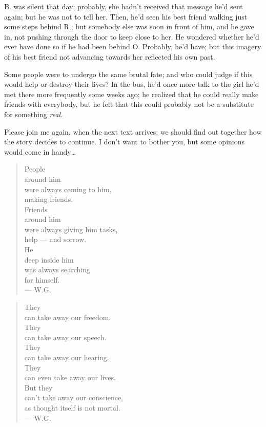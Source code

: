B. was silent that day; probably, she hadn't received that message he'd sent again; but he was not to tell her. Then, he'd seen his best friend walking just some steps behind R.; but somebody else was soon in front of him, and he gave in, not pushing through the door to keep close to her. He wondered whether he'd ever have done so if he had been behind O. Probably, he'd have; but this imagery of his best friend not advancing towards her reflected his own past.

Some people were to undergo the same brutal fate; and who could judge if this would help or destroy their lives?
In the bus, he'd once more talk to the girl he'd met there more frequently some weeks ago; he realized that he could really make friends with everybody, but he felt that this could probably not be a substitute for something \emph{real}.

Please join me again, when the next text arrives; we should find out together how the story decides to continue. 
I don't want to bother you, but some opinions would come in handy\ldots

\begin{quote}
People \\
around him \\
were always coming to him, \\
making friends. \\
Friends \\
around him \\
were always giving him tasks, \\
help --- and sorrow. \\
He \\
deep inside him \\
was always searching \\
for himself. \\
--- W.G.
\end{quote}

\begin{quote}
They \\
can take away our freedom. \\
They \\
can take away our speech. \\
They \\
can take away our hearing. \\
They \\
can even take away our lives. \\
But they \\
can't take away our conscience, \\
as thought itself is not mortal. \\
--- W.G.
\end{quote}

